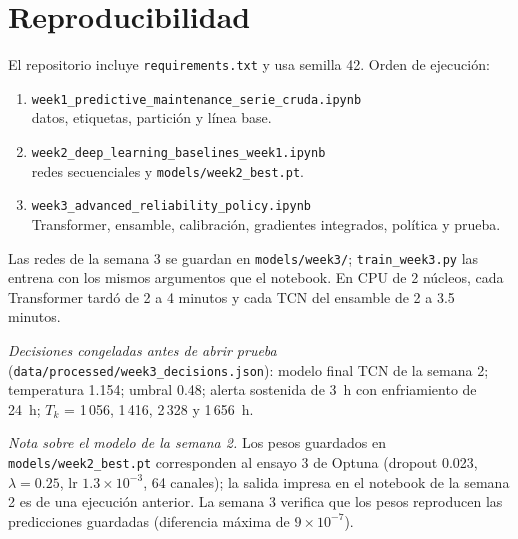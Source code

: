 \documentclass[conference,letterpaper]{IEEEtran}
\begin{document}
\section{Reproducibilidad}
{\raggedright
El repositorio incluye \texttt{requirements.txt} y usa semilla 42. Orden de ejecución:
\begin{enumerate}
\item {\footnotesize\texttt{week1\_predictive\_maintenance\_serie\_cruda.ipynb}}\\ datos, etiquetas, partición y línea base.
\item {\footnotesize\texttt{week2\_deep\_learning\_baselines\_week1.ipynb}}\\ redes secuenciales y \texttt{models/week2\_best.pt}.
\item {\footnotesize\texttt{week3\_advanced\_reliability\_policy.ipynb}}\\ Transformer, ensamble, calibración, gradientes integrados, política y prueba.
\end{enumerate}
Las redes de la semana 3 se guardan en \texttt{models/week3/}; \texttt{train\_week3.py} las entrena con los mismos argumentos que el notebook. En CPU de 2 núcleos, cada Transformer tardó de 2 a 4 minutos y cada TCN del ensamble de 2 a 3.5 minutos.

\textit{Decisiones congeladas antes de abrir prueba} (\texttt{data/processed/week3\_decisions.json}): modelo final TCN de la semana 2; temperatura 1.154; umbral 0.48; alerta sostenida de 3~h con enfriamiento de 24~h; $T_k$ = 1\,056, 1\,416, 2\,328 y 1\,656~h.

\textit{Nota sobre el modelo de la semana 2.} Los pesos guardados en \texttt{models/week2\_best.pt} corresponden al ensayo 3 de Optuna (dropout 0.023, $\lambda=0.25$, lr $1.3\times10^{-3}$, 64 canales); la salida impresa en el notebook de la semana 2 es de una ejecución anterior. La semana 3 verifica que los pesos reproducen las predicciones guardadas (diferencia máxima de $9\times10^{-7}$).\par}
\end{document}
